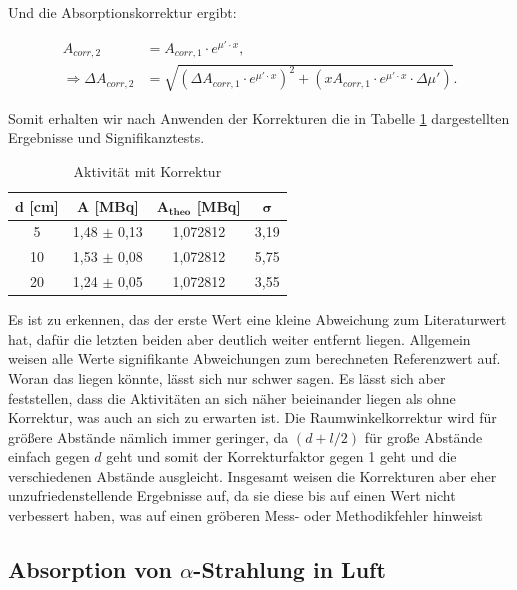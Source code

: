 \documentclass{article}
\begin{document}
Und die Absorptionskorrektur ergibt:

\begin{equation}
    \begin{split}
        A_{corr,2} &= A_{corr,1} \cdot e^{\mu' \cdot x}, \\
        \Rightarrow \Delta A_{corr,2} &= \sqrt{\left(\Delta A_{corr,1} \cdot e^{\mu' \cdot x}\right)^2 + \left(x A_{corr,1} \cdot e^{\mu' \cdot x} \cdot \Delta \mu' \right)}.
    \end{split}
\end{equation}


Somit erhalten wir nach Anwenden der Korrekturen die in Tabelle \ref{tab:A5-mitKorr} dargestellten Ergebnisse und Signifikanztests.

\begin{table}[!h]
    \centering
    \begin{tabular}{cccc}
        \hline
        $\bm{d}$ [cm] & $\bm{A}$ [MBq] & $\bm{A_{theo}}$ [MBq] & $\bm{\sigma}$  \\ \hline
         5  & 1,48 $\pm$ 0,13 & 1,072812 & 3,19 \\
         10 & 1,53 $\pm$ 0,08 & 1,072812 & 5,75 \\
         20 & 1,24 $\pm$ 0,05 & 1,072812 & 3,55 \\ \hline
    \end{tabular}%
    \caption{Aktivität mit Korrektur}
    \label{tab:A5-mitKorr}
\end{table}

Es ist zu erkennen, das der erste Wert eine kleine Abweichung zum Literaturwert hat, dafür die letzten beiden aber deutlich weiter entfernt liegen. Allgemein weisen alle Werte signifikante Abweichungen zum berechneten Referenzwert auf. Woran das liegen könnte, lässt sich nur schwer sagen. Es lässt sich aber feststellen, dass die Aktivitäten an sich näher beieinander liegen als ohne Korrektur, was auch an sich zu erwarten ist. Die Raumwinkelkorrektur wird für größere Abstände nämlich immer geringer, da $(d+l/2)$ für große Abstände einfach gegen $d$ geht und somit der Korrekturfaktor gegen 1 geht und die verschiedenen Abstände ausgleicht. Insgesamt weisen die Korrekturen aber eher unzufriedenstellende Ergebnisse auf, da sie diese bis auf einen Wert nicht verbessert haben, was auf einen gröberen Mess- oder Methodikfehler hinweist

\clearpage
\newpage

\subsection{Absorption von $\alpha$-Strahlung in Luft}
\end{document}
